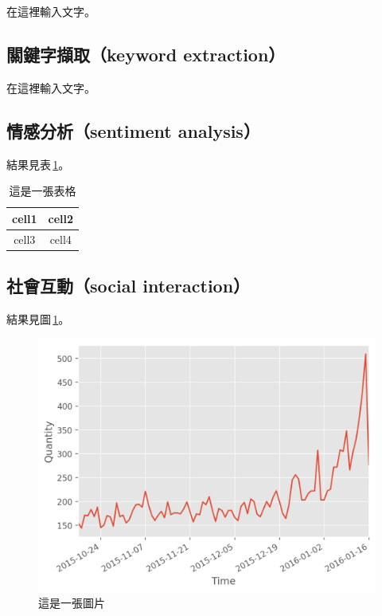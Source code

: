 \documentclass[letterpaper, 10pt, conference]{ieeeconf}   %
\begin{document}
\begin{CJK}{UTF8}{bsmi}
在這裡輸入文字。

\subsection*{關鍵字擷取（keyword extraction）}

在這裡輸入文字。

\subsection*{情感分析（sentiment analysis）}

結果見表\,\ref{t1}。

\begin{table}[!htbp]
\caption{這是一張表格}
\label{t1}
\begin{center}
\begin{tabular}{|c|c|}
\hline
cell1 & cell2 \\
\hline
cell3 & cell4 \\
\hline
\end{tabular}
\end{center}
\end{table}

\subsection*{社會互動（social interaction）}

結果見圖\,\ref{f1}。

\begin{figure}[!htbp]
\centering
\includegraphics[width=\columnwidth]{quantity_time_graph}
\caption{這是一張圖片}
\label{f1}
\end{figure}


\end{CJK}
\end{document}
